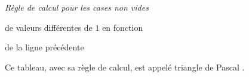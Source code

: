 \begin{multicols}{2}
\begin{center}
		\smallskip
		\itshape\small
		Règle de calcul pour les cases non vides 
		
		de valeurs différentes de $1$ en fonction
		
		de la ligne précédente
    \end{center}
    
    \vfill\null
\end{multicols}


\vspace{-1em}

Ce tableau, avec sa règle de calcul, est appelé \og triangle de Pascal \fg{} .


